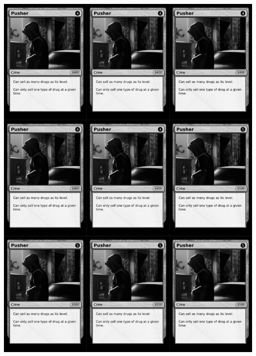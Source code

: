 \documentclass[a4paper]{article}
\begin{document}
\newpage

\begin{center}
	\centering
	\includegraphics[width=200.5mm,height=280.7mm]{output/temp/page11.png}
\end{center}
\end{document}

